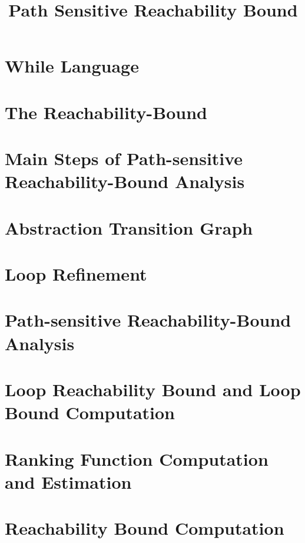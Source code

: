 \documentclass[a4paper,11pt]{article}
\begin{document}
\title{Path Sensitive Reachability Bound}

\author{}

\date{}

\maketitle
%
\tableofcontents

% 
\section{{While Language}}
\label{sec:language}

\section{{The Reachability-Bound}}
\label{sec:execution_rb}

\section{Main Steps of Path-sensitive Reachability-Bound Analysis}
\label{sec:static_rb}

\section{Abstraction Transition Graph}
\label{sec:progabs}

\section{Loop Refinement}
\label{sec:refine}

\section{Path-sensitive Reachability-Bound Analysis}
\label{sec:psrb}

  
\section{Loop Reachability Bound and Loop Bound Computation}
\label{sec:looprb}

\section{Ranking Function Computation and Estimation}
\label{sec:rank}

\section{Reachability Bound Computation}
\label{sec:alg-rb}

\end{document}
